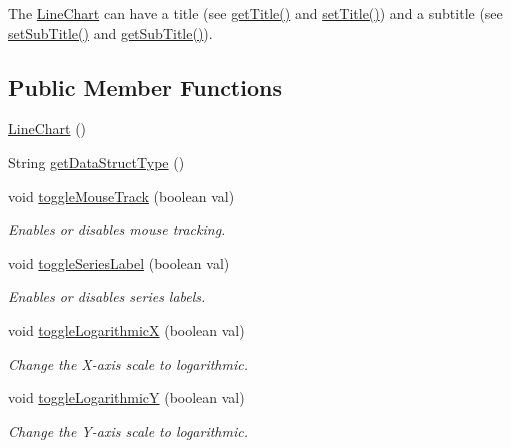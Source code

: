The \hyperlink{classbridges_1_1base_1_1_line_chart}{Line\+Chart} can have a title (see \hyperlink{classbridges_1_1base_1_1_line_chart_aedc5f75b158298b755ba0c31bcf84138}{get\+Title()} and \hyperlink{classbridges_1_1base_1_1_line_chart_a893519da804666988c49b918c87da2a2}{set\+Title()}) and a subtitle (see \hyperlink{classbridges_1_1base_1_1_line_chart_ad24bfdd49194f8e152fdb80e039762ad}{set\+Sub\+Title()} and \hyperlink{classbridges_1_1base_1_1_line_chart_a102006e90f2a226886538db0eeda6b08}{get\+Sub\+Title()}). \subsection*{Public Member Functions}
\begin{DoxyCompactItemize}
\item 
\hyperlink{classbridges_1_1base_1_1_line_chart_ae864fe5ae85e80ae2f035471fb216e68}{Line\+Chart} ()
\item 
String \hyperlink{classbridges_1_1base_1_1_line_chart_ae5d7ebffc6f29256f6fff368ef9a6c84}{get\+Data\+Struct\+Type} ()
\item 
void \hyperlink{classbridges_1_1base_1_1_line_chart_a095d16c1544cf373b8d2bf68ca864bd9}{toggle\+Mouse\+Track} (boolean val)
\begin{DoxyCompactList}\small\item\em Enables or disables mouse tracking. \end{DoxyCompactList}\item 
void \hyperlink{classbridges_1_1base_1_1_line_chart_adae74cfb09585727a96cf74ddf74d098}{toggle\+Series\+Label} (boolean val)
\begin{DoxyCompactList}\small\item\em Enables or disables series labels. \end{DoxyCompactList}\item 
void \hyperlink{classbridges_1_1base_1_1_line_chart_ad3e5e54c382ac605a81b6b61c250ad16}{toggle\+LogarithmicX} (boolean val)
\begin{DoxyCompactList}\small\item\em Change the X-\/axis scale to logarithmic. \end{DoxyCompactList}\item 
void \hyperlink{classbridges_1_1base_1_1_line_chart_a7946f217a7b3567ee1a1bd8266ed43ca}{toggle\+LogarithmicY} (boolean val)
\begin{DoxyCompactList}\small\item\em Change the Y-\/axis scale to logarithmic. \end{DoxyCompactList}\item 

\end{DoxyCompactItemize}

